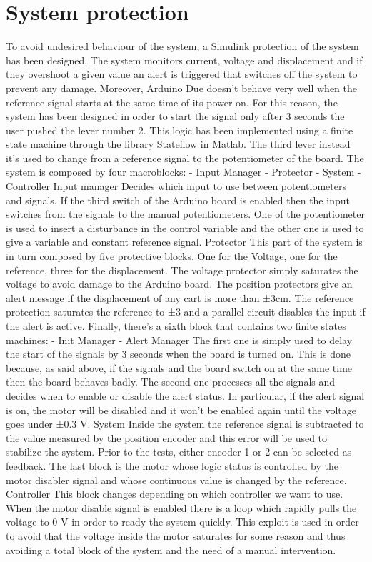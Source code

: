 \section{System protection}
To avoid undesired behaviour of the system, a Simulink protection of the system has been designed. The system monitors current, voltage and displacement and if they overshoot a given value an alert is triggered that switches off the system to prevent any damage. 
Moreover, Arduino Due doesn’t behave very well when the reference signal starts at the same time of its power on. For this reason, the system has been designed in order to start the signal only after 3 seconds the user pushed the lever number 2. This logic has been implemented using a finite state machine through the library Stateflow in Matlab.
The third lever instead it’s used to change from a reference signal to the potentiometer of the board.
The system is composed by four macroblocks:
-	Input Manager
-	Protector
-	System
-	Controller
Input manager
Decides which input to use between potentiometers and signals. If the third switch of the Arduino board is enabled then the input switches from the signals to the manual potentiometers. One of the potentiometer is used to insert a disturbance in the control variable and the other one is used to give a variable and constant reference signal.
Protector
This part of the system is in turn composed by five protective blocks. One for the Voltage, one for the reference, three for the displacement. 
The voltage protector simply saturates the voltage to avoid damage to the Arduino board.
The position protectors give an alert message if the displacement of any cart is more than ±3cm.
The reference protection saturates the reference to ±3 and a parallel circuit disables the input if the alert is active.
Finally, there’s a sixth block that contains two finite states machines: 
-	Init Manager
-	Alert Manager
The first one is simply used to delay the start of the signals by 3 seconds when the board is turned on. This is done because, as said above, if the signals and the board switch on at the same time then the board behaves badly. 
The second one processes all the signals and decides when to enable or disable the alert status. In particular, if the alert signal is on, the motor will be disabled and it won’t be enabled again until the voltage goes under ±0.3 V. 
System
Inside the system the reference signal is subtracted to the value measured by the position encoder and this error will be used to stabilize the system. Prior to the tests, either encoder 1 or 2 can be selected as feedback.
The last block is the motor whose logic status is controlled by the motor disabler signal and whose continuous value is changed by the reference.
Controller
This block changes depending on which controller we want to use. When the motor disable signal is enabled there is a loop which rapidly pulls the voltage to 0 V in order to ready the system quickly. This exploit is used in order to avoid that the voltage inside the motor saturates for some reason and thus avoiding a total block of the system and the need of a manual intervention.

